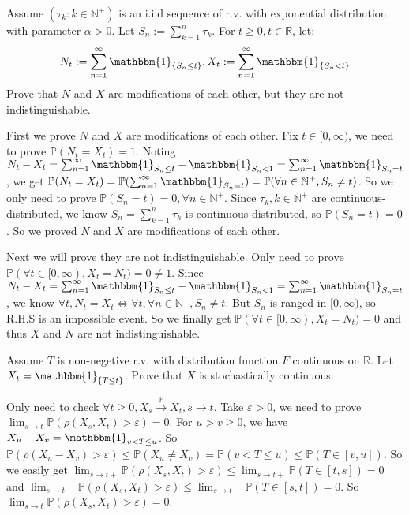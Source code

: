 \documentclass{ctexart}
\begin{document}
\begin{problem}\label{pro:4}
	Assume \((\tau_k:k \in \mathbb{N}^+)\) is an i.i.d sequence of r.v.
	with exponential distribution with parameter \(\alpha>0\).
	Let \(S_n:=\sum_{k=1}^{n}\tau_k\). For \(t \geq 0,t \in \mathbb{R}\), let:
	\[
		N_t:=\sum_{n=1}^{\infty}\mathbbm{1}_{\{S_n \leq t\}},
		X_t:=\sum_{n=1}^{\infty}\mathbbm{1}_{\{S_n < t\}}
	\]
	Prove that \(N\) and \(X\) are modifications of each other, but they are not indistinguishable.
\end{problem}
\begin{solution}
	First we prove \(N\) and \(X\) are modifications of each other.
	Fix \(t \in [0,\infty)\), we need to prove \(\mathbb{P}(N_t=X_t)=1\).
	Noting \(N_t-X_t = \sum_{n=1}^{\infty}\mathbbm{1}_{S_n \leq t}-\mathbbm{1}_{S_n<1}=\sum_{n=1}^{\infty}\mathbbm{1}_{S_n=t}\),
	we get \(\mathbb{P}(N_t=X_t)=\mathbb{P}(\sum_{n=1}^{\infty}\mathbbm{1}_{S_n=t})=\mathbb{P}(\forall n \in \mathbb{N}^+,S_n \neq t)\).
	So we only need to prove \(\mathbb{P}(S_n=t)=0,\forall n \in \mathbb{N}^+\).
	Since \(\tau_k,k \in \mathbb{N}^+\) are continuous-distributed, we know \(S_n=\sum_{k=1}^{n}\tau_k\) is continuous-distributed,
	so \(\mathbb{P}(S_n=t)=0\).
	So we proved \(N\) and \(X\) are modifications of each other.

	Next we will prove they are not indistinguishable.
	Only need to prove \(\mathbb{P}(\forall t \in [0,\infty),X_t=N_t)=0 \neq 1\).
	Since \(N_t-X_t = \sum_{n=1}^{\infty}\mathbbm{1}_{S_n \leq t}-\mathbbm{1}_{S_n<1}=\sum_{n=1}^{\infty}\mathbbm{1}_{S_n=t}\),
	we know \(\forall t,N_t=X_t \iff \forall t,\forall n \in \mathbb{N}^+,S_n \neq t\).
	But \(S_n\) is ranged in \([0,\infty)\), so R.H.S is an impossible event.
	So we finally get \(\mathbb{P}(\forall t \in [0,\infty),X_t=N_t)=0\) and thus \(X\) and \(N\) are not indistinguishable.
\end{solution}

\begin{problem}\label{pro:5}
	Assume \(T\) is non-negetive r.v. with distribution function \(F\) continuous on \(\mathbb{R}\).
	Let \(X_t=\mathbbm{1}_{\{T \leq t\}}\).
	Prove that \(X\) is stochastically continuous.
\end{problem}
\begin{solution}
	Only need to check \(\forall t \geq 0,X_s \overset{\mathbb{P}}{\to}X_t,s \to t\).
	Take \(\varepsilon >0\), we need to prove \(\lim_{s \to t}\mathbb{P}(\rho(X_s,X_t)>\varepsilon)=0\).
	For \(u>v \geq 0\), we have \(X_u-X_v=\mathbbm{1}_{v<T \leq u}\).
	So \(\mathbb{P}(\rho(X_u-X_v)>\varepsilon) \leq \mathbb{P}(X_u \neq X_v)=\mathbb{P}(v<T \leq u)\leq \mathbb{P}(T \in [v,u])\).
	So we easily get \(\lim_{s \to t+}\mathbb{P}(\rho(X_s,X_t)>\varepsilon)\leq \lim_{s \to t+}\mathbb{P}(T \in [t,s])=0\) and \(\lim_{s \to t-}\mathbb{P}(\rho(X_s,X_t)>\varepsilon)\leq \lim_{s \to t-}\mathbb{P}(T \in [s,t])=0\).
	So \(\lim_{s \to t}\mathbb{P}(\rho(X_s,X_t)>\varepsilon)=0\).
\end{solution}
\end{document}
